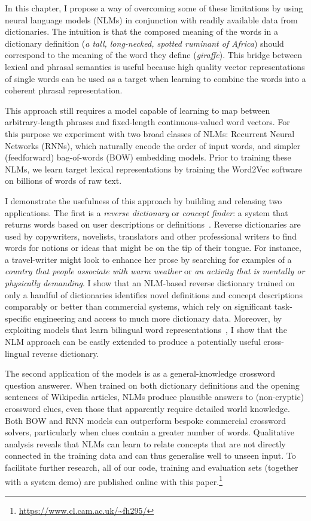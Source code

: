 In this chapter, I propose a way of overcoming some of these limitations by using neural language models (NLMs) in conjunction with readily available data from dictionaries. The intuition is that the composed meaning of the words in a dictionary definition (\emph{a tall, long-necked, spotted ruminant of Africa}) should correspond to the meaning of the word they define (\emph{giraffe}). This bridge between lexical and phrasal semantics is useful because high quality vector representations of single words can be used as a target when learning to combine the words into a coherent phrasal representation.
 
This approach still requires a model capable of learning to map between arbitrary-length phrases and fixed-length continuous-valued word vectors. For this purpose we experiment with two broad classes of NLMs: Recurrent Neural Networks (RNNs), which naturally encode the order of input words, and simpler (feedforward) bag-of-words (BOW) embedding models. Prior to training these NLMs, we learn target lexical representations by training the Word2Vec software~\cite{mikolov2013distributed} on billions of words of raw text. 

I demonstrate the usefulness of this approach by building and releasing two applications. The first is a \emph{reverse dictionary} or \emph{concept finder}: a system that returns words based on user descriptions or definitions~\cite{zock2004word}. Reverse dictionaries are used by copywriters, novelists, translators and other professional writers to find words for notions or ideas that might be on the tip of their tongue. For instance, a travel-writer might look to enhance her prose by searching for examples of a \emph{country that people associate with warm weather} or \emph{an activity that is mentally or physically demanding}. I show that an NLM-based reverse dictionary trained on only a handful of dictionaries identifies novel definitions and concept descriptions comparably or better than commercial systems, which rely on significant task-specific engineering and access to much more dictionary data. Moreover, by exploiting models that learn bilingual word representations~\cite{307754,Klementiev,hermann2013multilingual,gouws2014bilbowa}, I show that the NLM approach can be easily extended to produce a potentially useful cross-lingual reverse dictionary.

The second application of the models is as a general-knowledge crossword question answerer. When trained on both dictionary definitions and the opening sentences of Wikipedia articles, NLMs produce plausible answers to (non-cryptic) crossword clues, even those that apparently require detailed world knowledge. Both BOW and RNN models can outperform bespoke commercial crossword solvers, particularly when clues contain a greater number of words. Qualitative analysis reveals that NLMs can learn to relate concepts that are not directly connected in the training data and can thus generalise well to unseen input. To facilitate further research, all of our code, training and evaluation sets (together with a system demo) are published online with this paper.\footnote{
    \url{https://www.cl.cam.ac.uk/~fh295/}
}

